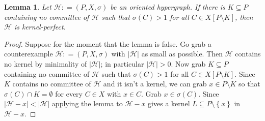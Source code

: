 \documentclass[12pt]{article}
\newtheorem{lemma}{Lemma}
\newcommand{\fancy}[1]{\mathcal{#1}}
\newcommand{\HH}{\fancy{H}}
\newcommand{\set}[1]{\left\{ #1 \right\}}
\newcommand{\card}[1]{\left|#1\right|}
\newcommand{\brackets}[1]{\left[ #1 \right]}
\newcommand{\DefinedAs}{\mathrel{\mathop:}=}
\begin{document}
\begin{lemma}
Let $\HH \DefinedAs (P,X,\sigma)$ be an oriented hypergraph.  If there is $K \subseteq P$ containing no committee of $\HH$ 
such that $\sigma(C) > 1$ for all $C \in X\brackets{P \setminus K}$, then $\HH$ is kernel-perfect.
\end{lemma}
\begin{proof}
Suppose for the moment that the lemma is false.  Go grab a counterexample $\HH \DefinedAs (P,X,\sigma)$ with $\card{\HH}$ as small as possible.
Then $\HH$ contains no kernel by minimality of $\card{\HH}$; in particular $\card{\HH} > 0$. Now grab $K \subseteq P$ containing no committee of $\HH$ such that $\sigma(C) > 1$ for all $C \in X\brackets{P \setminus K}$.  Since $K$ contains no
committee of $\HH$ and it isn't a kernel, we can grab $x \in P\setminus K$ so that $\sigma(C) \cap K = \emptyset$ for every $C \in X$ with $x \in C$.  Grab $x \in \sigma(C)$.  Since $\card{\HH - x} < \card{\HH}$ applying the lemma to $\HH -x$ gives a kernel $L \subseteq P \setminus\set{x}$ in $\HH-x$.
\end{proof}
\end{document}
